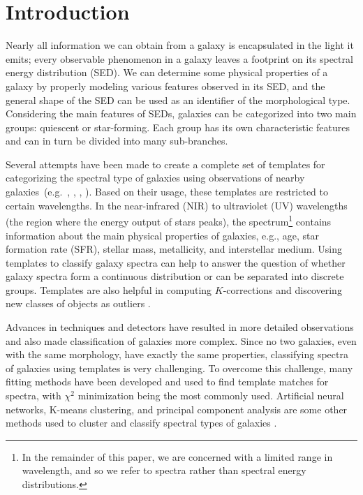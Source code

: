 \section{Introduction}
\label{sec: intro_somz}


Nearly all information we can obtain from a galaxy is encapsulated in the light it emits; every observable phenomenon in a galaxy leaves a footprint on its spectral energy distribution (SED).
We can determine some physical properties of a galaxy by properly modeling various features observed in its SED, and the general shape of the SED can be used as an identifier of the morphological type.
Considering the main features of SEDs, galaxies can be categorized into two main groups: quiescent or star-forming.
Each group has its own characteristic features and can in turn be divided into many sub-branches.


Several attempts have been made to create a complete set of templates for categorizing the spectral type of galaxies using observations of nearby galaxies~(e.g.~\citealt{Kinney93}, \citealt[][hereafter ]{Kinney96}, \citealt{Bershady00}, \citealt{Mannucci01}). 
Based on their usage, these templates are restricted to certain wavelengths.
In the near-infrared (NIR) to ultraviolet (UV) wavelengths (the region where the energy output of stars peaks), the spectrum\footnote{In the remainder of this paper, we are concerned with a limited range in wavelength, and so we refer to spectra rather than spectral energy distributions.} contains information about the main physical properties of galaxies, e.g., age, star formation rate (SFR), stellar mass, metallicity, and interstellar medium. 
Using templates to classify galaxy spectra can help to answer the question of whether galaxy spectra form a continuous distribution or can  be separated into discrete groups.
Templates are also helpful in computing $K$-corrections and discovering new classes of objects as outliers \citep{Folkes96}.


Advances in techniques and detectors have resulted in more detailed observations and also made classification of galaxies more complex.
Since no two galaxies, even with the same morphology, have exactly the same properties, classifying spectra of galaxies using templates is very challenging.
To overcome this challenge, many fitting methods have been developed and used to find template matches for spectra, with $\chi^2$ minimization being the most commonly used. 
Artificial neural networks, K-means clustering, and principal component analysis are some other methods used to cluster and classify spectral types of galaxies \citep[e.g.][]{Allen13,Ordov14,Shi15}.

